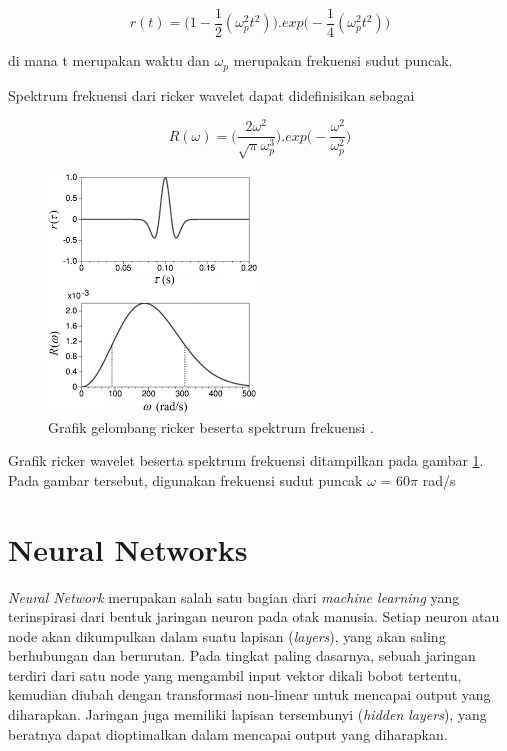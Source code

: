 \begin{equation}
  \label{eq:rickerTimeDomain}
  r(t) =  \big(1 -  \frac{1}{2} (  \omega _{p} ^{2}  t^{2} ) \big)  . exp \big(- \frac{1}{4} ( \omega _{p} ^{2}  t^{2} ) \big) 
\end{equation}

di mana t merupakan waktu dan $\omega_{p}$ merupakan frekuensi sudut puncak.

Spektrum frekuensi dari ricker wavelet dapat didefinisikan sebagai

\begin{equation}
  \label{eq:rickerTimeDomain}
  R( \omega ) =  \big( \frac{2 \omega ^{2}}{  \sqrt{ \pi }  \omega _{p} ^{3}} \big)  . exp \big(- \frac{ \omega ^{2}}{ \omega _{p} ^{2}} \big) 
\end{equation}

\begin{figure}[ht]
  \centering
  \includegraphics[scale=1]{gambar/ricker.jpg}
  \caption{Grafik gelombang ricker beserta spektrum frekuensi \parencite{rickerWavelet}.}
  \label{fig:gelombangRicker}
\end{figure}

Grafik ricker wavelet beserta spektrum frekuensi ditampilkan pada gambar \ref{fig:gelombangRicker}. 
Pada gambar tersebut, digunakan frekuensi sudut puncak $\omega$ = 60$\pi$ rad/s

\section{Neural Networks}
\label{sec:neuralNetworks}

\emph{Neural Network} merupakan salah satu bagian dari \emph{machine learning} yang terinspirasi dari bentuk jaringan neuron pada otak manusia. 
Setiap neuron atau node akan dikumpulkan dalam suatu lapisan (\emph{layers}), yang akan saling berhubungan dan berurutan. 
Pada tingkat paling dasarnya, sebuah jaringan terdiri dari satu node yang mengambil input vektor dikali bobot tertentu, kemudian diubah dengan transformasi non-linear untuk mencapai output yang diharapkan. 
Jaringan juga memiliki lapisan tersembunyi (\emph{hidden layers}), yang beratnya dapat dioptimalkan dalam mencapai output yang diharapkan.

